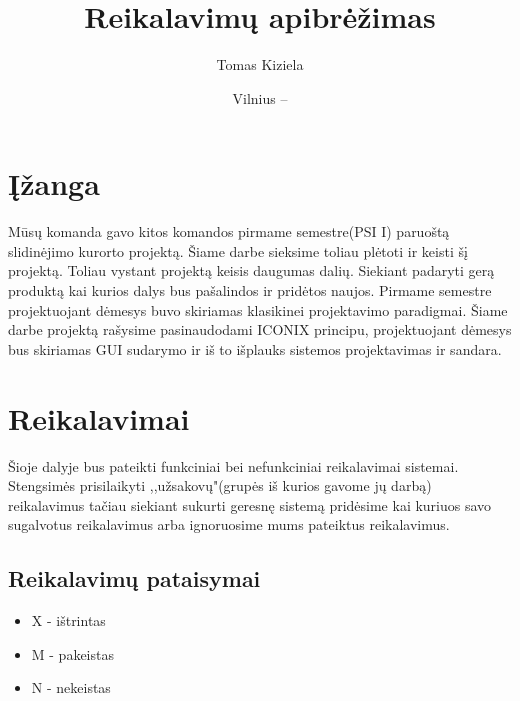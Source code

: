 \documentclass[oneside]{VUMIFPSkursinis}
\title{Reikalavimų apibrėžimas}
\author{Tomas Kiziela}
\date{Vilnius – \the\year}
\begin{document}
\maketitle
\tableofcontents

\section{Įžanga}
Mūsų komanda gavo kitos komandos pirmame semestre(PSI I) paruoštą slidinėjimo kurorto projektą. Šiame darbe sieksime toliau plėtoti ir keisti šį projektą. Toliau vystant projektą keisis daugumas dalių. Siekiant padaryti gerą produktą kai kurios  dalys bus pašalindos ir pridėtos naujos. Pirmame semestre projektuojant dėmesys buvo skiriamas klasikinei projektavimo paradigmai. Šiame darbe projektą rašysime pasinaudodami ICONIX principu, projektuojant dėmesys bus skiriamas GUI sudarymo ir iš to išplauks sistemos projektavimas ir sandara. 

\section{Reikalavimai}
Šioje dalyje bus pateikti funkciniai bei nefunkciniai reikalavimai sistemai. Stengsimės prisilaikyti ,,užsakovų"(grupės iš kurios gavome jų darbą) reikalavimus tačiau siekiant sukurti geresnę sistemą pridėsime kai kuriuos savo sugalvotus reikalavimus arba ignoruosime mums pateiktus reikalavimus. 

\subsection{Reikalavimų pataisymai}
	\begin{itemize}
		\item{X - ištrintas}
		\item{M - pakeistas}
		\item{N - nekeistas}
	\end{itemize}

\end{document}
